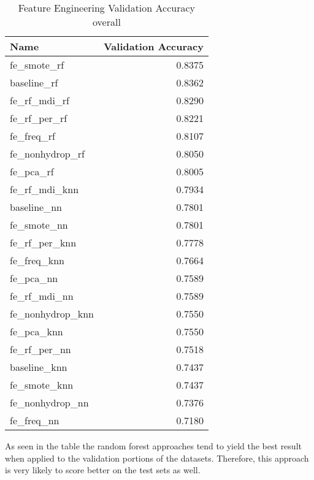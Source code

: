 \begin{table}[H]
    \begin{center}
        \caption{Feature Engineering Validation Accuracy \\ overall}
        \begin{tabular}{lr}
            \toprule
            Name               & Validation Accuracy \\
            \midrule
            fe\_smote\_rf      & 0.8375              \\
            baseline\_rf       & 0.8362              \\
            fe\_rf\_mdi\_rf    & 0.8290              \\
            fe\_rf\_per\_rf    & 0.8221              \\
            fe\_freq\_rf       & 0.8107              \\
            fe\_nonhydrop\_rf  & 0.8050              \\
            fe\_pca\_rf        & 0.8005              \\
            fe\_rf\_mdi\_knn   & 0.7934              \\
            baseline\_nn       & 0.7801              \\
            fe\_smote\_nn      & 0.7801              \\
            fe\_rf\_per\_knn   & 0.7778              \\
            fe\_freq\_knn      & 0.7664              \\
            fe\_pca\_nn        & 0.7589              \\
            fe\_rf\_mdi\_nn    & 0.7589              \\
            fe\_nonhydrop\_knn & 0.7550              \\
            fe\_pca\_knn       & 0.7550              \\
            fe\_rf\_per\_nn    & 0.7518              \\
            baseline\_knn      & 0.7437              \\
            fe\_smote\_knn     & 0.7437              \\
            fe\_nonhydrop\_nn  & 0.7376              \\
            fe\_freq\_nn       & 0.7180              \\
            \bottomrule
        \end{tabular}
    \end{center}
\end{table}

As seen in the table the random forest approaches tend to yield the best result when applied to the validation portions of the datasets.
Therefore, this approach is very likely to score better on the test sets as well. 
